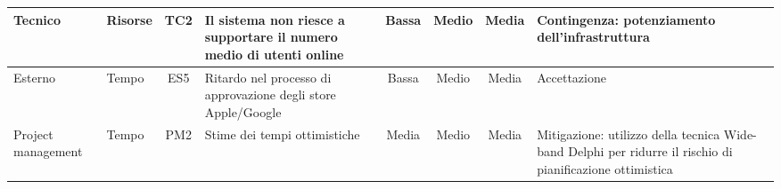 \documentclass[11pt,a4paper]{article}
\begin{document}
\begin{landscape}
\begin{tabular}{|p{2.2cm}|p{2.0cm}|c|p{6.0cm}|c|c|c|p{6.5cm}|}
Tecnico & Risorse & TC2 & Il sistema non riesce a supportare il numero medio di utenti online & Bassa & Medio & Media & Contingenza: potenziamento dell’infrastruttura \\\hline
Esterno & Tempo & ES5 & Ritardo nel processo di approvazione degli store Apple/Google & Bassa & Medio & Media & Accettazione \\\hline
Project management & Tempo & PM2 & Stime dei tempi ottimistiche & Media & Medio & Media & Mitigazione: utilizzo della tecnica Wide-band Delphi per ridurre il rischio di pianificazione ottimistica \\\hline
\end{tabular}
\renewcommand{\arraystretch}{1.0}
\normalsize\end{landscape}
\label{sec:gantt}
\end{document}
